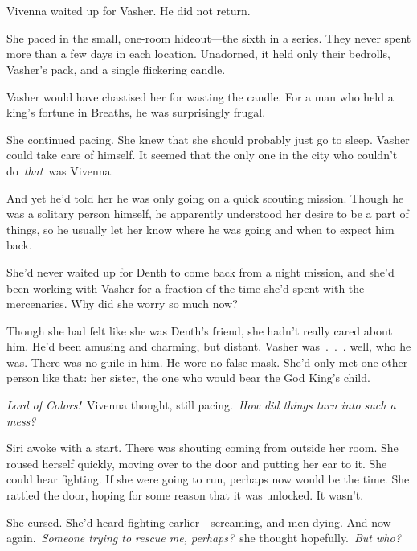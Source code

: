 \chapter{}

Vivenna waited up for Vasher. He did not return.

She paced in the small, one-room hideout—the sixth in a series. They never spent more than a few days in each location. Unadorned, it held only their bedrolls, Vasher’s pack, and a single flickering candle.

Vasher would have chastised her for wasting the candle. For a man who held a king’s fortune in Breaths, he was surprisingly frugal.

She continued pacing. She knew that she should probably just go to sleep. Vasher could take care of himself. It seemed that the only one in the city who couldn’t do~\textit{that}~was Vivenna.

And yet he’d told her he was only going on a quick scouting mission. Though he was a solitary person himself, he apparently understood her desire to be a part of things, so he usually let her know where he was going and when to expect him back.

She’d never waited up for Denth to come back from a night mission, and she’d been working with Vasher for a fraction of the time she’d spent with the mercenaries. Why did she worry so much now?

Though she had felt like she was Denth’s friend, she hadn’t really cared about him. He’d been amusing and charming, but distant. Vasher was~.~.~. well, who he was. There was no guile in him. He wore no false mask. She’d only met one other person like that: her sister, the one who would bear the God King’s child.

\textit{Lord of Colors!}~Vivenna thought, still pacing.~\textit{How did things turn into such a mess?}

\orn

Siri awoke with a start. There was shouting coming from outside her room. She roused herself quickly, moving over to the door and putting her ear to it. She could hear fighting. If she were going to run, perhaps now would be the time. She rattled the door, hoping for some reason that it was unlocked. It wasn’t.

She cursed. She’d heard fighting earlier—screaming, and men dying. And now again.~\textit{Someone trying to rescue me, perhaps?}~she thought hopefully.~\textit{But who?}

